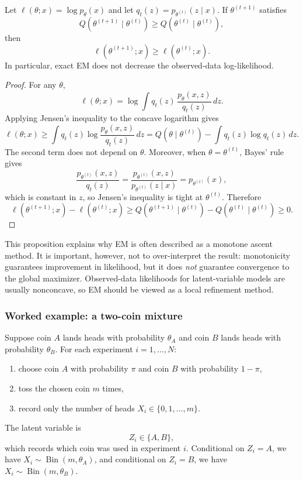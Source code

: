 \begin{proposition}[EM monotonicity]
\label{prop:em-monotonicity}
Let $\ell(\theta;x)=\log p_\theta(x)$ and let $q_t(z)=p_{\theta^{(t)}}(z\mid x)$.
If $\theta^{(t+1)}$ satisfies
\[
  Q(\theta^{(t+1)}\mid \theta^{(t)}) \ge Q(\theta^{(t)}\mid \theta^{(t)}),
\]
then
\[
  \ell(\theta^{(t+1)};x) \ge \ell(\theta^{(t)};x).
\]
In particular, exact EM does not decrease the observed-data log-likelihood.
\end{proposition}
\begin{proof}
For any $\theta$,
\[
  \ell(\theta;x)
  =
  \log \int q_t(z)\,\frac{p_\theta(x,z)}{q_t(z)}\,dz.
\]
Applying Jensen's inequality to the concave logarithm gives
\[
  \ell(\theta;x)
  \ge
  \int q_t(z)\log \frac{p_\theta(x,z)}{q_t(z)}\,dz
  =
  Q(\theta\mid \theta^{(t)}) - \int q_t(z)\log q_t(z)\,dz.
\]
The second term does not depend on $\theta$.
Moreover, when $\theta=\theta^{(t)}$, Bayes' rule gives
\[
  \frac{p_{\theta^{(t)}}(x,z)}{q_t(z)}
  =
  \frac{p_{\theta^{(t)}}(x,z)}{p_{\theta^{(t)}}(z\mid x)}
  =
  p_{\theta^{(t)}}(x),
\]
which is constant in $z$, so Jensen's inequality is tight at $\theta^{(t)}$.
Therefore
\[
  \ell(\theta^{(t+1)};x) - \ell(\theta^{(t)};x)
  \ge
  Q(\theta^{(t+1)}\mid \theta^{(t)}) - Q(\theta^{(t)}\mid \theta^{(t)})
  \ge 0.
\]
\end{proof}

This proposition explains why EM is often described as a monotone ascent method.
It is important, however, not to over-interpret the result:
monotonicity guarantees improvement in likelihood, but it does \emph{not} guarantee convergence to the global maximizer.
Observed-data likelihoods for latent-variable models are usually nonconcave, so EM should be viewed as a local refinement method.

\subsubsection{Worked example: a two-coin mixture}
\label{subsubsec:em-two-coins}

Suppose coin $A$ lands heads with probability $\theta_A$ and coin $B$ lands heads with probability $\theta_B$.
For each experiment $i=1,\dots,N$:
\begin{enumerate}[leftmargin=*]
  \item choose coin $A$ with probability $\pi$ and coin $B$ with probability $1-\pi$,
  \item toss the chosen coin $m$ times,
  \item record only the number of heads $X_i\in\{0,1,\dots,m\}$.
\end{enumerate}
The latent variable is
\[
  Z_i \in \{A,B\},
\]
which records which coin was used in experiment $i$.
Conditional on $Z_i=A$, we have $X_i\sim \operatorname{Bin}(m,\theta_A)$, and conditional on $Z_i=B$, we have $X_i\sim \operatorname{Bin}(m,\theta_B)$.

